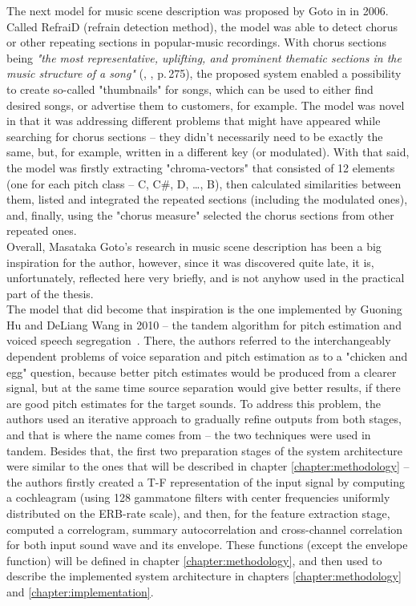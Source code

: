 The next model for music scene description was proposed by Goto in \cite{Goto2006} in 2006. Called \mbox{RefraiD} (refrain detection method), the model was able to detect chorus or other repeating sections in popular-music recordings. With chorus sections being \textit{"the most representative, uplifting, and prominent thematic sections in the music structure of a song"} (\cite{Goto2006}, \cite{Wang2006}, p.\,275), the proposed system enabled a possibility to create so-called "thumbnails" for songs, which can be used to either find desired songs, or advertise them to customers, for example. The model was novel in that it was addressing different problems that might have appeared while searching for chorus sections -- they didn't necessarily need to be exactly the same, but, for example, written in a different key (or modulated). With that said, the model was firstly extracting "chroma-vectors" that consisted of 12 elements (one for each pitch class -- C, C\#, D, \dots{}, B), then calculated similarities between them, listed and integrated the repeated sections (including the modulated ones), and, finally, using the "chorus measure" selected the chorus sections from other repeated ones.\\

Overall, Masataka Goto's research in music scene description has been a big inspiration for the author, however, since it was discovered quite late, it is, unfortunately, reflected here very briefly, and is not anyhow used in the practical part of the thesis.\\

The model that did become that inspiration is the one implemented by Guoning Hu and DeLiang Wang in 2010 -- the tandem algorithm for pitch estimation and voiced speech seg\-re\-ga\-tion~\cite{Hu2010}. There, the authors referred to the interchangeably dependent problems of voice separation and pitch estimation as to a "chicken and egg" question, because better pitch estimates would be produced from a clearer signal, but at the same time source separation would give better results, if there are good pitch estimates for the target sounds. To address this problem, the authors used an iterative approach to gradually refine outputs from both stages, and that is where the name comes from -- the two techniques were used in tandem. Besides that, the first two preparation stages of the system architecture were similar to the ones that will be described in chapter \ref{chapter:methodology} -- the authors firstly created a T-F representation of the input signal by computing a cochleagram (using 128 gammatone filters with center frequencies uniformly distributed on the ERB-rate scale), and then, for the feature extraction stage, computed a correlogram, summary autocorrelation and cross-channel correlation for both input sound wave and its envelope. These functions (except the envelope function) will be defined in chapter \ref{chapter:methodology}, and then used to describe the implemented system architecture in chapters \ref{chapter:methodology} and \ref{chapter:implementation}.\\

